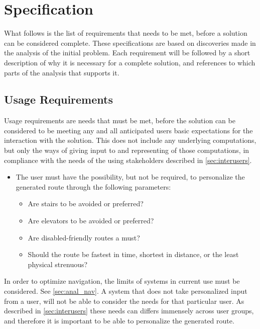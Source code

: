 \section{Specification} %
\label{sec:specification}

What follows is the list of requirements that needs to be met, before a solution can be considered complete. These specifications are based on discoveries made in the analysis of the initial problem. Each requirement will be followed by a short description of why it is necessary for a complete solution, and references to which parts of the analysis that supports it.

\subsection{Usage Requirements}

Usage requirements are needs that must be met, before the solution can be considered to be meeting any and all anticipated users basic expectations for the interaction with the solution. This does not include any underlying computations, but only the ways of giving input to and representing of those computations, in compliance with the needs of the using stakeholders described in \cref{sec:interusers}.

\begin{itemize}
	\item The user must have the possibility, but not be required, to personalize the generated route through the following parameters:
			\begin{itemize}
				\item Are stairs to be avoided or preferred?
				\item Are elevators to be avoided or preferred?
				\item Are disabled-friendly routes a must?
				\item Should the route be fastest in time, shortest in distance, or the least physical strenuous?
			\end{itemize}
\end{itemize}

In order to optimize navigation, the limits of systems in current use must be considered. See \cref{sec:anal_nav}. A system that does not take personalized input from a user, will not be able to consider the needs for that particular user. As described in \cref{sec:interusers} these needs can differs immensely across user groups, and therefore it is important to be able to personalize the generated route.

